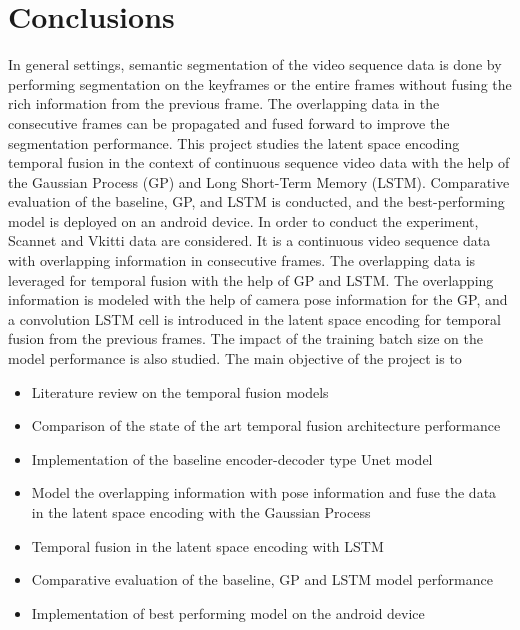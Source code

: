 

    \chapter{Conclusions}
	\label{chap:conclusion}
	
	In general settings, semantic segmentation of the video sequence data is done by performing segmentation on the keyframes or the entire frames without fusing the rich information from the previous frame. The overlapping data in the consecutive frames can be propagated and fused forward to improve the segmentation performance. This project studies the latent space encoding temporal fusion in the context of continuous sequence video data with the help of the Gaussian Process (GP) and Long Short-Term Memory (LSTM). Comparative evaluation of the baseline, GP, and LSTM is conducted, and the best-performing model is deployed on an android device. In order to conduct the experiment, Scannet and Vkitti data are considered. It is a continuous video sequence data with overlapping information in consecutive frames. The overlapping data is leveraged for temporal fusion with the help of GP and LSTM. The overlapping information is modeled with the help of camera pose information for the GP, and a convolution LSTM cell is introduced in the latent space encoding for temporal fusion from the previous frames. The impact of the training batch size on the model performance is also studied. The main objective of the project is to
	
	\begin{itemize}
		\item Literature review on the temporal fusion models
		\item Comparison of the state of the art temporal fusion architecture performance
		\item Implementation of the baseline encoder-decoder type Unet model
		\item Model the overlapping information with pose information and fuse the data in the latent space encoding with the Gaussian Process
		\item Temporal fusion in the latent space encoding with LSTM
		\item Comparative evaluation of the baseline, GP and LSTM model performance
		\item Implementation of best performing model on the android device
		
	\end{itemize} 
	

